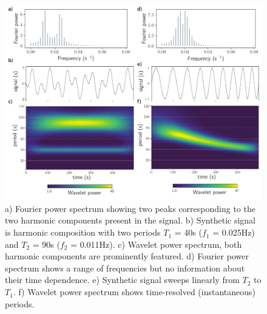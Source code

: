 \begin{figure}[h!]
\centering
\includegraphics[width=\linewidth]{figures/Figure1}
\caption{a) Fourier power spectrum showing two peaks corresponding to the two harmonic components present in the signal.  b) Synthetic  signal is harmonic composition with two periods $T_1$ = 40s ($f_1$ = 0.025Hz) and $T_2$ = 90s ($f_2$ = 0.011Hz). c) Wavelet power spectrum, both harmonic components are prominently featured. d) Fourier power spectrum shows a range of frequencies but no information about their time dependence. e) Synthetic signal sweeps linearly from $T_2$ to $T_1$. f) Wavelet power spectrum shows time-resolved (instantaneous) periods. }
\label{fig1}
\end{figure}

